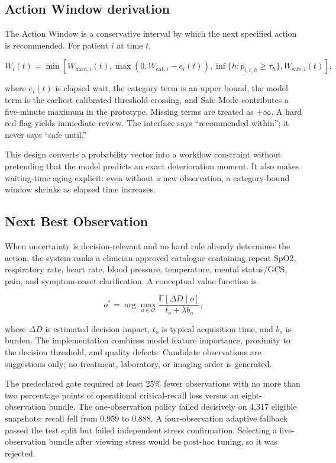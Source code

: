 \documentclass[11pt,a4paper]{article}
\begin{document}
\subsection{Action Window derivation}

The Action Window is a conservative interval by which the next specified action is recommended. For patient $i$ at time $t$,

\begin{equation}
W_i(t)=\min\left[
W_{\mathrm{hard},i}(t),
\max(0,W_{\mathrm{cat},i}-e_i(t)),
\inf\{h:p_{i,t,h}\ge\tau_h\},
W_{\mathrm{safe},i}(t)
\right],
\end{equation}

where $e_i(t)$ is elapsed wait, the category term is an upper bound, the model term is the earliest calibrated threshold crossing, and Safe Mode contributes a five-minute maximum in the prototype. Missing terms are treated as $+\infty$. A hard red flag yields immediate review. The interface says ``recommended within''; it never says ``safe until.''

This design converts a probability vector into a workflow constraint without pretending that the model predicts an exact deterioration moment. It also makes waiting-time aging explicit: even without a new observation, a category-bound window shrinks as elapsed time increases.

\subsection{Next Best Observation}

When uncertainty is decision-relevant and no hard rule already determines the action, the system ranks a clinician-approved catalogue containing repeat SpO2, respiratory rate, heart rate, blood pressure, temperature, mental status/GCS, pain, and symptom-onset clarification. A conceptual value function is

\begin{equation}
o^*=\arg\max_{o\in\mathcal O}
\frac{\mathbb{E}[\Delta D\mid o]}{t_o+\lambda b_o},
\end{equation}

where $\Delta D$ is estimated decision impact, $t_o$ is typical acquisition time, and $b_o$ is burden. The implementation combines model feature importance, proximity to the decision threshold, and quality defects. Candidate observations are suggestions only; no treatment, laboratory, or imaging order is generated.

The predeclared gate required at least 25\% fewer observations with no more than two percentage points of operational critical-recall loss versus an eight-observation bundle. The one-observation policy failed decisively on 4,317 eligible snapshots: recall fell from 0.959 to 0.888. A four-observation adaptive fallback passed the test split but failed independent stress confirmation. Selecting a five-observation bundle after viewing stress would be post-hoc tuning, so it was rejected.
\end{document}
